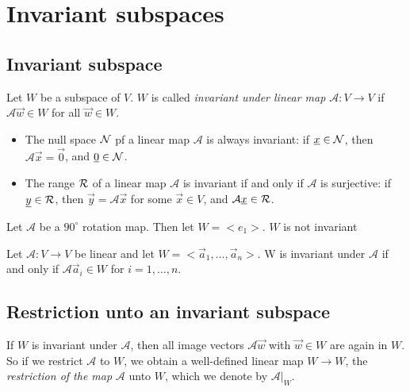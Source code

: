 \section{Invariant subspaces}
\subsection{Invariant subspace}
\begin{definition}
    Let $W$ be a subspace of $V$. $W$ is called \emph{invariant under linear map $\mathcal{A}: V \to V$} if $\mathcal{A}\vec{w} \in W$ for all $\vec{w} \in W$.
\end{definition}

\begin{example}
    \begin{itemize}
        \item The null space $\mathcal{N}$ pf a linear map $\mathcal{A}$ is always invariant: if $\underline{x} \in \mathcal{N}$, then $\mathcal{A}\vec{x} = \vec{0}$,
            and $\underline{0} \in \mathcal{N}$.
        \item The range $\mathcal{R}$ of a linear map $\mathcal{A}$ is invariant if and only if $\mathcal{A}$ is surjective: if $\underline{y} \in \mathcal{R}$,
            then $\vec{y} = \mathcal{A}\vec{x}$ for some $\vec{x} \in V$, and $\mathcal{A}\underline{x} \in \mathcal{R}$.
    \end{itemize}
\end{example}

\begin{example}
    Let $\mathcal{A}$ be a $90^\circ$ rotation map. Then let $W = <e_1>$. $W$ is not invariant
\end{example}

\begin{theorem}
    Let $\mathcal{A}: V \to V$ be linear and let $W = <\vec{a}_1, \dots, \vec{a}_n>$. W is invariant under $\mathcal{A}$ if
    and only if $\mathcal{A}\vec{a}_i \in W$ for $i = 1,\dots,n$.
\end{theorem}

\subsection{Restriction unto an invariant subspace}
\begin{definition}
    If $W$ is invariant under $\mathcal{A}$, then all image vectors $\mathcal{A}\vec{w}$ with $\vec{w} \in W$ are again in $W$.
    So if we restrict $\mathcal{A}$ to $W$, we obtain a well-defined linear map $W \to W$, the \emph{restriction of the map} $\mathcal{A}$
    unto $W$, which we denote by $\mathcal{A}|_W$.
\end{definition}

